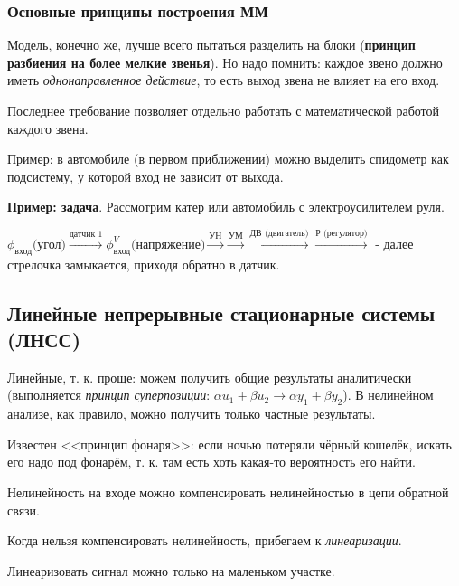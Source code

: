 \documentclass[main.tex]{subfiles}
\begin{document}
\subsubsection{Основные принципы построения ММ}

Модель, конечно же, лучше всего пытаться разделить на блоки (\textbf{принцип разбиения на более мелкие звенья}).
Но надо помнить: каждое звено должно иметь \emph{однонаправленное действие}, то есть выход звена не влияет на его вход.

Последнее требование позволяет отдельно работать с математической работой каждого звена.

Пример: в автомобиле (в первом приближении) можно выделить спидометр как подсистему, у которой вход не зависит от выхода.

\textbf{Пример: задача}. Рассмотрим катер или автомобиль с электроусилителем руля.

$ \phi_{\text{вход}} \text{(угол)} \xrightarrow{\text{датчик 1}}
 \phi_{\text{вход}}^V \text{(напряжение)} \xrightarrow{\text{УН}} \xrightarrow{\text{УМ}} \xrightarrow{\text{ДВ (двигатель)}} \xrightarrow{\text{Р (регулятор)}}  $ - далее стрелочка замыкается, приходя обратно в датчик. %
 
\subsection{Линейные непрерывные стационарные системы (ЛНСС)}

Линейные, т. к. проще: можем получить общие результаты аналитически (выполняется \emph{принцип суперпозиции}: $ \alpha u_1 + \beta u_2 \to \alpha y_1 + \beta y_2 $).
В нелинейном анализе, как правило, можно получить только частные результаты.

Известен <<принцип фонаря>>: если ночью потеряли чёрный кошелёк, искать его надо под фонарём, т. к. там есть хоть какая-то вероятность его найти.

Нелинейность на входе можно компенсировать нелинейностью в цепи обратной связи.

Когда нельзя компенсировать нелинейность, прибегаем к \emph{линеаризации}.

Линеаризовать сигнал можно только на маленьком участке.
\end{document}
